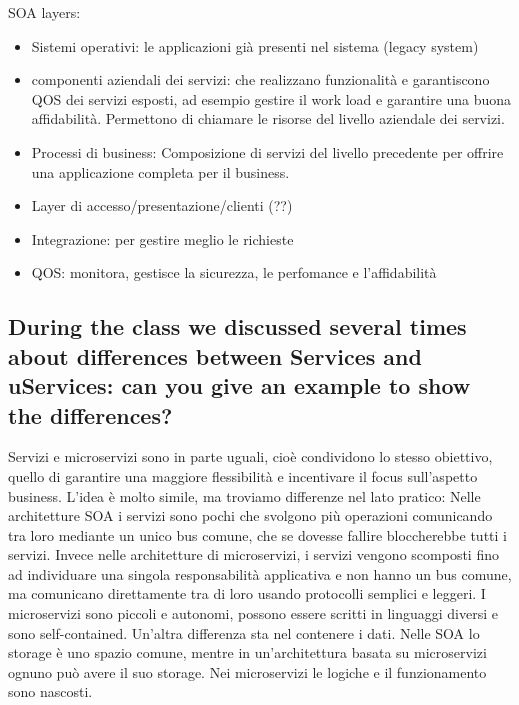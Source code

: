 \documentclass{article}
\begin{document}
SOA layers:
\begin{itemize}
    \item Sistemi operativi: le applicazioni già presenti nel sistema (legacy system)
    \item componenti aziendali dei servizi: che realizzano funzionalità e garantiscono QOS dei servizi esposti, ad esempio gestire il work load e garantire una buona affidabilità. Permettono di chiamare le risorse del livello aziendale dei servizi.
    \item Processi di business: Composizione di servizi del livello precedente per offrire una applicazione completa per il business.
    \item Layer di accesso/presentazione/clienti (??)
    \item Integrazione: per gestire meglio le richieste
    \item QOS: monitora, gestisce la sicurezza, le perfomance e l'affidabilità
\end{itemize}

\subsection{During the class we discussed several times about differences between Services and uServices: can you give an example to show the differences?}
Servizi e microservizi sono in parte uguali, cioè condividono lo stesso obiettivo, quello di garantire una maggiore flessibilità e incentivare il focus sull'aspetto business.
L'idea è molto simile, ma troviamo differenze nel lato pratico: 
Nelle architetture SOA i servizi sono pochi che svolgono più operazioni comunicando tra loro mediante un unico bus comune, che se dovesse fallire bloccherebbe tutti i servizi.
Invece nelle architetture di microservizi, i servizi vengono scomposti fino ad individuare una singola responsabilità applicativa e non hanno un bus comune, ma comunicano direttamente tra di loro usando protocolli semplici e leggeri. I microservizi sono piccoli e autonomi, possono essere scritti in linguaggi diversi e sono self-contained.
Un'altra differenza sta nel contenere i dati. Nelle SOA lo storage è uno spazio comune, mentre in un'architettura basata su microservizi ognuno può avere il suo storage.
Nei microservizi le logiche e il funzionamento sono nascosti.
\end{document}
